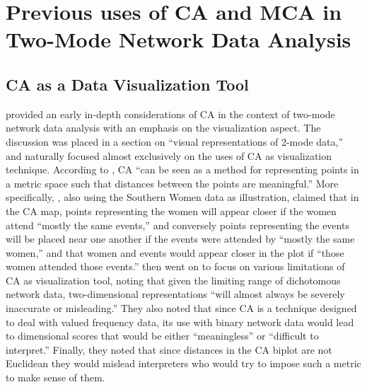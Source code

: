 \documentclass[a4paper,fleqn]{cas-sc}
\begin{document}
\section{Previous uses of CA and MCA in Two-Mode Network Data Analysis}

\subsection{CA as a Data Visualization Tool}

\citet{borgatti1997network} provided an early in-depth considerations of CA in the context of two-mode network data analysis with an emphasis on the visualization aspect. The discussion was placed in a section on ``visual representations of 2-mode data,'' and naturally focused almost exclusively on the uses of CA as visualization technique. According to \citet[246]{borgatti1997network}, CA ``can be seen as a method for representing points in a metric space such that distances between the points are meaningful.'' More specifically, \citet{borgatti1997network}, also using the Southern Women data as illustration,  claimed that in the CA map, points representing the women will appear closer if the women attend ``mostly the same events,'' and conversely points representing the events will be placed near one another if the events were attended by ``mostly the same women,'' and that women and events would appear closer in the plot if ``those women attended those events.'' \citet[247-249]{borgatti1997network} then went on to focus on various limitations of CA as visualization tool, noting that given the limiting range of dichotomous network data, two-dimensional representations ``will almost always be severely inaccurate or misleading.'' They also noted that since CA is a technique designed to deal with valued frequency data, its use with binary network data would lead to dimensional scores that would be either ``meaningless'' or ``difficult to interpret.'' Finally, they noted that since distances in the CA biplot are not Euclidean they would mislead interpreters who would try to impose such a metric to make sense of them. 
\end{document}
